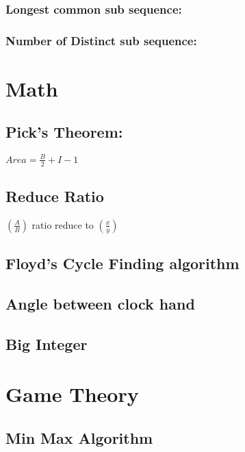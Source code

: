 \documentclass[11pt]{report}
\begin{document}
\subsection{Longest common sub sequence: }

\newpage
\subsection{Number of Distinct sub sequence: }


\chapter{Math}
\section{Pick's Theorem: }
$Area=\frac{B}{2}+I-1$
\section{Reduce Ratio}
$\left(\frac{A}{B}\right)$ ratio reduce to $\left(\frac{x}{y}\right)$

\section{Floyd's Cycle Finding algorithm}

\section{Angle between clock hand}

\section{Big Integer}



\chapter{Game Theory}
\section{Min Max Algorithm}

\newpage
\end{document}
